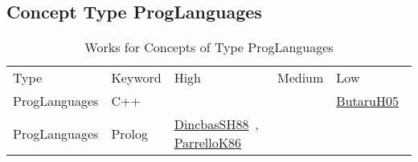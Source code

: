 \clearpage
\subsection{Concept Type ProgLanguages}
\label{sec:ProgLanguages}
{\scriptsize
\begin{longtable}{lp{3cm}>{\raggedright\arraybackslash}p{6cm}>{\raggedright\arraybackslash}p{6cm}>{\raggedright\arraybackslash}p{8cm}}
\rowcolor{white}\caption{Works for Concepts of Type ProgLanguages}\\ \toprule
\rowcolor{white}Type & Keyword & High & Medium & Low\\ \midrule\endhead
\bottomrule
\endfoot
ProgLanguages & C++ &  &  & \href{../cars/works/ButaruH05.pdf}{ButaruH05}~\cite{ButaruH05}\\
ProgLanguages & Prolog & \href{../cars/works/DincbasSH88.pdf}{DincbasSH88}~\cite{DincbasSH88}, \href{../cars/works/ParrelloK86.pdf}{ParrelloK86}~\cite{ParrelloK86} &  & \\
\end{longtable}
}

